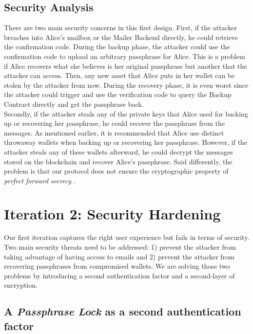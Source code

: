 \documentclass[runningheads]{llncs}
\begin{document}
\subsection{Security Analysis}

There are two main security concerns in this first design. First, if the attacker breaches into Alice's mailbox or the Mailer Backend directly, he could retrieve the confirmation code. During the backup phase, the attacker could use the confirmation code to upload an arbitrary passphrase for Alice. This is a problem if Alice recovers what she believes is her original passphrase but another that the attacker can access. Then, any new asset that Alice puts in her wallet can be stolen by the attacker from now. During the recovery phase, it is even worst since the attacker could trigger and use the verification code to query the Backup Contract directly and get the passphrase back. \\

Secondly, if the attacker steals any of the private keys that Alice used for backing up or recovering her passphrase, he could recover the passphrase from the messages. As mentioned earlier, it is recommended that Alice use distinct throwaway wallets when backing up or recovering her passphrase. However, if the attacker steals any of these wallets afterward, he could decrypt the messages stored on the blockchain and recover Alice's passphrase. Said differently, the problem is that our protocol does not ensure the cryptographic property of {\em perfect forward secrecy} \cite{Krawczyk2005}.

\section{Iteration 2: Security Hardening}
\label{iteration2}

Our first iteration captures the right user experience but fails in terms of security. Two main security threats need to be addressed: 1) prevent the attacker from taking advantage of having access to emails and 2) prevent the attacker from recovering passphrases from compromised wallets. We are solving those two problems by introducing a second authentication factor and a second-layer of encryption. 

\subsection{A {\em Passphrase Lock} as a second authentication factor}
\end{document}
